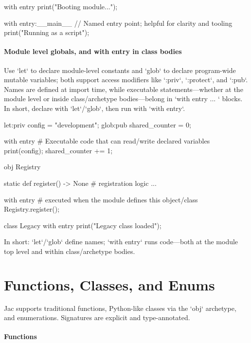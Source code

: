 \begin{jacblock}
with entry {
    print("Booting module...");
}

with entry:__main__ {
    // Named entry point; helpful for clarity and tooling
    print("Running as a script");
}
\end{jacblock}

\paragraph{Module level globals, and with entry in class bodies}

Use `let` to declare module-level constants and `glob` to declare program-wide mutable variables; both support access modifiers like `:priv`, `:protect`, and `:pub`. Names are defined at import time, while executable statements—whether at the module level or inside class/archetype bodies—belong in `with entry { ... }` blocks. In short, declare with `let`/`glob`, then run with `with entry`.

\begin{jacblock}
let:priv config = "development";
glob:pub shared_counter = 0;

with entry {
    # Executable code that can read/write declared variables
    print(config);
    shared_counter += 1;
}

obj Registry {
    static def register() -> None {
        # registration logic ...
    }

    with entry {
        # executed when the module defines this object/class
        Registry.register();
    }
}

class Legacy {
    with entry {
        print("Legacy class loaded");
    }
}
\end{jacblock}

In short: `let`/`glob` define names; `with entry` runs code—both at the module top level and within class/archetype bodies.

\section{Functions, Classes, and Enums}

Jac supports traditional functions, Python-like classes via the `obj` archetype, and enumerations. Signatures are explicit and type-annotated.

\paragraph{Functions}

